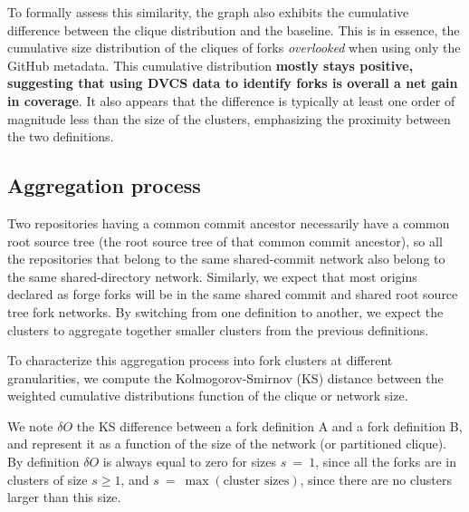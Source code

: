To formally assess this similarity, the graph also exhibits the cumulative
difference between the clique distribution and the baseline. This is in
essence, the cumulative size distribution of the cliques of forks
\emph{overlooked} when using only the GitHub metadata. 
This cumulative
distribution \textbf{mostly stays positive, suggesting that using DVCS data to
identify forks is overall a net gain in coverage}.
It also appears that the
difference is typically at least one order of magnitude less than the size of
the clusters, emphasizing the proximity between the two definitions.

\subsection{Aggregation process}%
\label{sec:forks-aggregation-process}

Two repositories having a common commit ancestor necessarily have a common root
source tree (the root source tree of that common commit ancestor), so all the
repositories that belong to the same shared-commit network also belong to
the same shared-directory network.
Similarly, we expect that most origins declared as forge forks will be
in the same shared commit and shared root source tree fork networks.
By switching from one definition to another, we expect the clusters to
aggregate together smaller clusters from the previous definitions.

To characterize this aggregation process into fork clusters at different
granularities, we compute the Kolmogorov-Smirnov (KS) distance between the
weighted cumulative distributions function of the clique or network size.

We note $\delta O$ the KS difference between a fork
definition A and a fork definition B, and
represent it as a function of the size of the network (or partitioned clique).
By definition $\delta O$ is always equal to zero for sizes $s~=~1$, since all
the forks are in clusters of size $s \geq 1$, and $s~=~\max(\text{cluster
sizes})$, since there are no clusters larger than this size.

